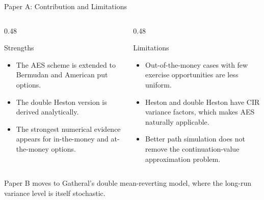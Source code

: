 \begin{frame}{Paper A: Contribution and Limitations}
  \begin{columns}[T,onlytextwidth]
    \begin{column}{0.48\textwidth}
      \begin{block}{Strengths}
        \begin{itemize}
          \item The AES scheme is extended to Bermudan and American put options.
          \item The double Heston version is derived analytically.
          \item The strongest numerical evidence appears for in-the-money and at-the-money options.
        \end{itemize}
      \end{block}
    \end{column}
    \begin{column}{0.48\textwidth}
      \begin{block}{Limitations}
        \begin{itemize}
          \item Out-of-the-money cases with few exercise opportunities are less uniform.
          \item Heston and double Heston have CIR variance factors, which makes AES naturally applicable.
          \item Better path simulation does not remove the continuation-value approximation problem.
        \end{itemize}
      \end{block}
    \end{column}
  \end{columns}

  \vspace{0.45em}
  \begin{center}
    \small Paper B moves to Gatheral's double mean-reverting model, where the long-run variance level is itself stochastic.
  \end{center}
\end{frame}
